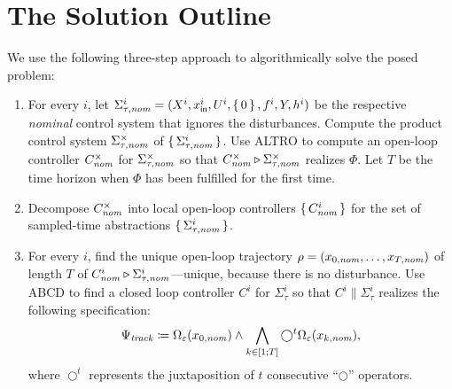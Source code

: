 \section{The Solution Outline}

%

We use the following three-step approach to algorithmically solve the posed problem:

\begin{enumerate}
	\item For every $i$, let $\Sigma_{\tau,\mathit{nom}}^i = (X^i,x_{\mathsf{in}}^i,U^i,\set{0},f^i,Y,h^i)$ be the respective \emph{nominal} control system that ignores the disturbances.
			Compute the product control system $\Sigma^\times_{\tau,\mathit{nom}}$ of $\set{\Sigma^i_{\tau,\mathit{nom}}}$. 
			Use ALTRO to compute an open-loop controller $C^\times_{\mathit{nom}}$ for $\Sigma^\times_{\tau,\mathit{nom}}$ so that $C^\times_{\mathit{nom}}\triangleright\Sigma_{\tau,\mathit{nom}}^{\times}$ realizes  $\Phi$.
			Let $T$ be the time horizon when $\Phi$ has been fulfilled for the first time.
	\item Decompose $C^\times_{\mathit{nom}}$ into local open-loop controllers $\set{C^i_{\mathit{nom}}}$ for the set of sampled-time abstractions $\set{\Sigma^i_{\tau,\mathit{nom}}}$.
	\item For every $i$, find the unique open-loop trajectory $\rho=(x_{0,\mathit{nom}},\ldots,x_{T,\mathit{nom}})$ of length $T$ of $C^i_{\mathit{nom}}\triangleright \Sigma_{\tau,\mathit{nom}}^i$---unique, because there is no disturbance.
			Use ABCD to find a closed loop controller $C^i$ for $\Sigma_{\tau}^i$ so that $C^i\parallel \Sigma_\tau^i$ realizes the following specification:
			\begin{align}
				\label{eq:ltl_spec}
				\Psi_{\mathit{track}}\coloneqq \Omega_\varepsilon(x_{0,\mathit{nom}}) \wedge \bigwedge_{k\in [1;T]} \bigcirc^t \Omega_\varepsilon(x_{k,\mathit{nom}}),
			\end{align}
			where $\bigcirc^t$ represents the juxtaposition of $t$ consecutive ``$\bigcirc$'' operators.
\end{enumerate}

